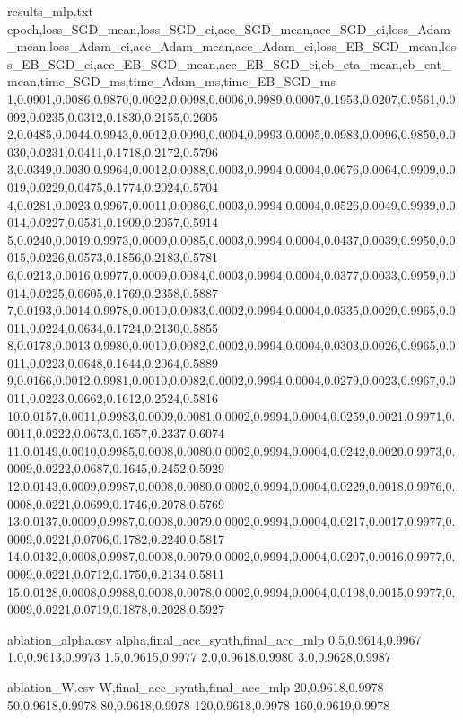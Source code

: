 \begin{filecontents*}{results_mlp.txt}
epoch,loss_SGD_mean,loss_SGD_ci,acc_SGD_mean,acc_SGD_ci,loss_Adam_mean,loss_Adam_ci,acc_Adam_mean,acc_Adam_ci,loss_EB_SGD_mean,loss_EB_SGD_ci,acc_EB_SGD_mean,acc_EB_SGD_ci,eb_eta_mean,eb_ent_mean,time_SGD_ms,time_Adam_ms,time_EB_SGD_ms
1,0.0901,0.0086,0.9870,0.0022,0.0098,0.0006,0.9989,0.0007,0.1953,0.0207,0.9561,0.0092,0.0235,0.0312,0.1830,0.2155,0.2605
2,0.0485,0.0044,0.9943,0.0012,0.0090,0.0004,0.9993,0.0005,0.0983,0.0096,0.9850,0.0030,0.0231,0.0411,0.1718,0.2172,0.5796
3,0.0349,0.0030,0.9964,0.0012,0.0088,0.0003,0.9994,0.0004,0.0676,0.0064,0.9909,0.0019,0.0229,0.0475,0.1774,0.2024,0.5704
4,0.0281,0.0023,0.9967,0.0011,0.0086,0.0003,0.9994,0.0004,0.0526,0.0049,0.9939,0.0014,0.0227,0.0531,0.1909,0.2057,0.5914
5,0.0240,0.0019,0.9973,0.0009,0.0085,0.0003,0.9994,0.0004,0.0437,0.0039,0.9950,0.0015,0.0226,0.0573,0.1856,0.2183,0.5781
6,0.0213,0.0016,0.9977,0.0009,0.0084,0.0003,0.9994,0.0004,0.0377,0.0033,0.9959,0.0014,0.0225,0.0605,0.1769,0.2358,0.5887
7,0.0193,0.0014,0.9978,0.0010,0.0083,0.0002,0.9994,0.0004,0.0335,0.0029,0.9965,0.0011,0.0224,0.0634,0.1724,0.2130,0.5855
8,0.0178,0.0013,0.9980,0.0010,0.0082,0.0002,0.9994,0.0004,0.0303,0.0026,0.9965,0.0011,0.0223,0.0648,0.1644,0.2064,0.5889
9,0.0166,0.0012,0.9981,0.0010,0.0082,0.0002,0.9994,0.0004,0.0279,0.0023,0.9967,0.0011,0.0223,0.0662,0.1612,0.2524,0.5816
10,0.0157,0.0011,0.9983,0.0009,0.0081,0.0002,0.9994,0.0004,0.0259,0.0021,0.9971,0.0011,0.0222,0.0673,0.1657,0.2337,0.6074
11,0.0149,0.0010,0.9985,0.0008,0.0080,0.0002,0.9994,0.0004,0.0242,0.0020,0.9973,0.0009,0.0222,0.0687,0.1645,0.2452,0.5929
12,0.0143,0.0009,0.9987,0.0008,0.0080,0.0002,0.9994,0.0004,0.0229,0.0018,0.9976,0.0008,0.0221,0.0699,0.1746,0.2078,0.5769
13,0.0137,0.0009,0.9987,0.0008,0.0079,0.0002,0.9994,0.0004,0.0217,0.0017,0.9977,0.0009,0.0221,0.0706,0.1782,0.2240,0.5817
14,0.0132,0.0008,0.9987,0.0008,0.0079,0.0002,0.9994,0.0004,0.0207,0.0016,0.9977,0.0009,0.0221,0.0712,0.1750,0.2134,0.5811
15,0.0128,0.0008,0.9988,0.0008,0.0078,0.0002,0.9994,0.0004,0.0198,0.0015,0.9977,0.0009,0.0221,0.0719,0.1878,0.2028,0.5927
\end{filecontents*}

\begin{filecontents*}{ablation_alpha.csv}
alpha,final_acc_synth,final_acc_mlp
0.5,0.9614,0.9967
1.0,0.9613,0.9973
1.5,0.9615,0.9977
2.0,0.9618,0.9980
3.0,0.9628,0.9987
\end{filecontents*}

\begin{filecontents*}{ablation_W.csv}
W,final_acc_synth,final_acc_mlp
20,0.9618,0.9978
50,0.9618,0.9978
80,0.9618,0.9978
120,0.9618,0.9978
160,0.9619,0.9978
\end{filecontents*}

